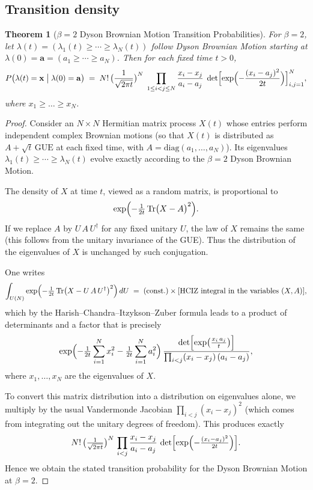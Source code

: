 \documentclass[letterpaper,11pt,oneside,reqno]{article}
\numberwithin{equation}{section}
\newtheorem{theorem}[proposition]{Theorem}
\theoremstyle{definition}
\begin{document}
\subsection{Transition density}

\begin{theorem}[\(\beta=2\) Dyson Brownian Motion Transition Probabilities]
	\label{thm:dbm-transition}
For \(\beta=2\), let \(\lambda(t)=(\lambda_1(t)\ge \cdots \ge \lambda_N(t))\) follow Dyson Brownian Motion starting at \(\lambda(0)=\mathbf{a}=(a_1\ge \cdots \ge a_N)\).  Then for each fixed time \(t>0\),
\[
P\bigl(\lambda(t) = \mathbf{x}\;\big|\;\lambda(0)=\mathbf{a}\bigr)
\;=\;
N!\,\bigl(\frac{1}{\sqrt{2\pi t}}\bigr)^{N}
\;\prod_{1\le i<j\le N}\frac{x_i - x_j}{a_i - a_j}
\;\det\Bigl[\exp\Bigl(-\frac{(x_i - a_j)^2}{2t}\Bigr)\Bigr]_{i,j=1}^N,
\]
where \(x_1 \ge \dots \ge x_N\).
\end{theorem}

\begin{proof}
Consider an \(N\times N\) Hermitian matrix process \(X(t)\) whose entries perform independent complex Brownian motions (so that \(X(t)\) is distributed as \(A + \sqrt{t}\,\mathrm{GUE}\) at each fixed time, with \(A=\mathrm{diag}(a_1,\dots,a_N)\)).  Its eigenvalues \(\lambda_1(t)\ge \cdots \ge \lambda_N(t)\) evolve exactly according to the \(\beta=2\) Dyson Brownian Motion.

The density of \(X\) at time \(t\), viewed as a random matrix, is proportional to
\[
\exp\Bigl(-\tfrac{1}{2t}\,\mathrm{Tr}\bigl(X-A\bigr)^2\Bigr).
\]
If we replace \(A\) by \(U\,A\,U^\dagger\) for any fixed unitary \(U\), the law of \(X\) remains the same (this follows from the unitary invariance of the GUE).  Thus the distribution of the eigenvalues of \(X\) is unchanged by such conjugation.

One writes
\[
\int_{U(N)}
\exp\Bigl(-\tfrac{1}{2t}\,\mathrm{Tr}\bigl(X-U\,A\,U^\dagger\bigr)^2\Bigr)\,dU
\;=\;
\text{(const.)} \times
\text{[HCIZ integral in the variables }(X,A)\text{]},
\]
which by the Harish--Chandra--Itzykson--Zuber formula leads to a product of determinants and a factor that is precisely
\[
\exp\Bigl(-\tfrac{1}{2t}\sum_{i=1}^N x_i^2
- \tfrac{1}{2t}\sum_{i=1}^N a_i^2\Bigr)\,
\frac{\det\Bigl[\exp\bigl(\tfrac{x_i\,a_j}{t}\bigr)\Bigr]}{\prod_{i<j}(x_i - x_j)\,(a_i - a_j)},
\]
where \(x_1,\dots,x_N\) are the eigenvalues of \(X\).

To convert this matrix distribution into a distribution on eigenvalues alone, we multiply by the usual Vandermonde Jacobian
\(\prod_{i<j}(x_i - x_j)^2\)
(which comes from integrating out the unitary degrees of freedom).  This produces exactly
\[
N!\,\bigl(\tfrac{1}{\sqrt{2\pi t}}\bigr)^{N}\,
\prod_{i<j}\frac{x_i - x_j}{a_i - a_j}
\,\det\Bigl[\exp\Bigl(-\tfrac{(x_i - a_j)^2}{2t}\Bigr)\Bigr].
\]
Hence we obtain the stated transition probability for the Dyson Brownian Motion at \(\beta=2\).
\end{proof}
\end{document}
